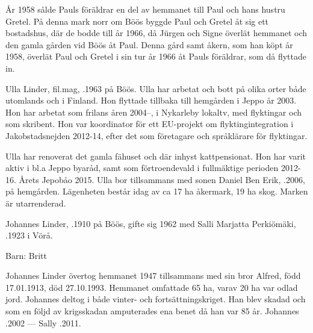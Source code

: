 År 1958 sålde Pauls föräldrar en del av hemmanet till Paul och hans hustru Gretel. På denna mark norr om Böös byggde Paul och Gretel åt sig ett bostadshus, där de bodde till år 1966, då Jürgen och Signe överlät hemmanet och den gamla gården vid Böös åt Paul. Denna gård samt åkern, som han köpt år 1958, överlät Paul och Gretel i sin tur år 1966 åt Pauls föräldrar, som då flyttade in.






Ulla Linder, fil.mag,  .1963 på Böös. Ulla har arbetat och bott på olika orter både utomlands och i Finland. Hon flyttade tillbaka till hemgården i Jeppo år 2003. Hon har arbetat som frilans åren 2004--, i Nykarleby lokaltv, med flyktingar och som skribent. Hon var koordinator för ett EU-projekt om flyktingintegration i Jakobstadsnejden 2012-14, efter det som företagare och språklärare för flyktingar.

Ulla har renoverat det gamla fähuset och där inhyst kattpensionat. Hon har varit aktiv i bl.a Jeppo byaråd, samt som förtroendevald i fullmäktige perioden 2012-16. Årets Jepobåo 2015. Ulla bor tillsammans med sonen Daniel Ben Erik, .2006, på hemgården. Lägenheten består idag av ca 17 ha åkermark, 19 ha skog. Marken är utarrenderad.


Johannes Linder, .1910 på Böös, gifte sig 1962 med Salli Marjatta Perkiömäki, .1923 i Vörå.

Barn: Britt 

Johannes Linder övertog hemmanet 1947 tillsammans med sin bror Alfred, född 17.01.1913, död 27.10.1993. Hemmanet omfattade 65 ha, varav 20 ha var odlad jord. Johannes deltog i både vinter- och fortsättningskriget. Han blev skadad och som en följd av krigsskadan amputerades ena benet då han var 85 år.
Johannes .2002  ---  Sally .2011.



